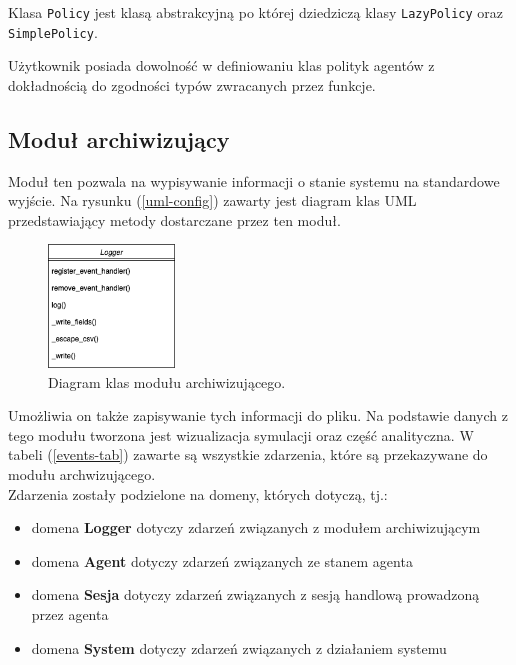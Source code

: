 \documentclass{article}
\begin{document}
Klasa \texttt{Policy} jest klasą abstrakcyjną po której dziedziczą klasy \texttt{LazyPolicy} oraz \texttt{SimplePolicy}.

Użytkownik posiada dowolność w definiowaniu klas polityk agentów z dokładnością do zgodności typów zwracanych przez funkcje.

\subsection{Moduł archiwizujący}

Moduł ten pozwala na wypisywanie informacji o stanie systemu na standardowe wyjście.
Na rysunku (\ref{uml-config}) zawarty jest diagram 
klas UML przedstawiający metody dostarczane przez ten moduł.

\begin{figure}[H]
	\centering
	\includegraphics[width=0.3\textwidth, height=0.3\textheight]{./logger-uml.png}
	\caption{Diagram klas modułu archiwizującego.}
	\label{logger-agent}
\end{figure}

Umożliwia on także zapisywanie tych informacji do pliku. 
Na podstawie danych z tego modułu tworzona jest wizualizacja symulacji oraz część analityczna.
W tabeli (\ref{events-tab}) zawarte są wszystkie zdarzenia, które są przekazywane do modułu archwizującego. \\
Zdarzenia zostały podzielone na domeny, których dotyczą, tj.:

\begin{itemize}
	\item domena \textbf{Logger} dotyczy zdarzeń związanych z modułem archiwizującym
	\item domena \textbf{Agent} dotyczy zdarzeń związanych ze stanem agenta 
	\item domena \textbf{Sesja} dotyczy zdarzeń związanych z sesją handlową prowadzoną przez agenta 
	\item domena \textbf{System} dotyczy zdarzeń związanych z działaniem systemu 
\end{itemize}
\end{document}
